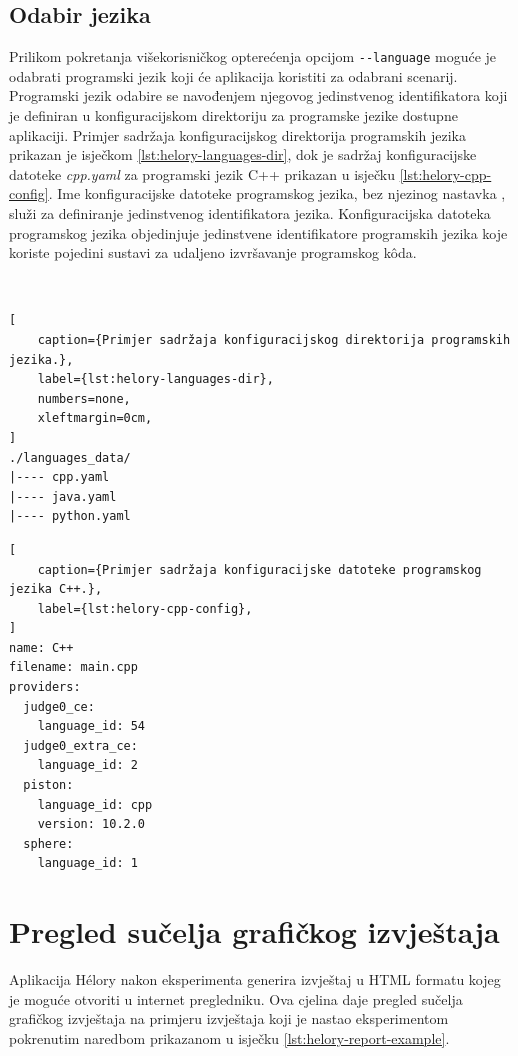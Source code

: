 \documentclass[times, utf8, diplomski]{fer}
\begin{document}
\subsection{Odabir jezika}
Prilikom pokretanja višekorisničkog opterećenja opcijom \lstinline{--language} moguće je odabrati programski jezik koji će aplikacija koristiti za odabrani scenarij. Programski jezik odabire se navođenjem njegovog jedinstvenog identifikatora koji je definiran u konfiguracijskom direktoriju za programske jezike dostupne aplikaciji. Primjer sadržaja konfiguracijskog direktorija programskih jezika prikazan je isječkom \ref{lst:helory-languages-dir}, dok je sadržaj konfiguracijske datoteke \textit{cpp.yaml} za programski jezik C++ prikazan u isječku \ref{lst:helory-cpp-config}. Ime konfiguracijske datoteke programskog jezika, bez njezinog nastavka , služi za definiranje jedinstvenog identifikatora jezika. Konfiguracijska datoteka programskog jezika objedinjuje jedinstvene identifikatore programskih jezika koje koriste pojedini sustavi za udaljeno izvršavanje programskog kôda.

\

\begin{lstlisting}[
    caption={Primjer sadržaja konfiguracijskog direktorija programskih jezika.},
    label={lst:helory-languages-dir},
    numbers=none,
    xleftmargin=0cm,
]
./languages_data/
|---- cpp.yaml
|---- java.yaml
|---- python.yaml
\end{lstlisting}

\pagebreak

\begin{lstlisting}[
    caption={Primjer sadržaja konfiguracijske datoteke programskog jezika C++.},
    label={lst:helory-cpp-config},
]
name: C++
filename: main.cpp
providers:
  judge0_ce:
    language_id: 54
  judge0_extra_ce:
    language_id: 2
  piston:
    language_id: cpp
    version: 10.2.0
  sphere:
    language_id: 1
\end{lstlisting}


\section{Pregled sučelja grafičkog izvještaja}
Aplikacija Hélory nakon eksperimenta generira izvještaj u HTML formatu kojeg je moguće otvoriti u internet pregledniku. Ova cjelina daje pregled sučelja grafičkog izvještaja na primjeru izvještaja koji je nastao eksperimentom pokrenutim naredbom prikazanom u isječku \ref{lst:helory-report-example}.
\end{document}

